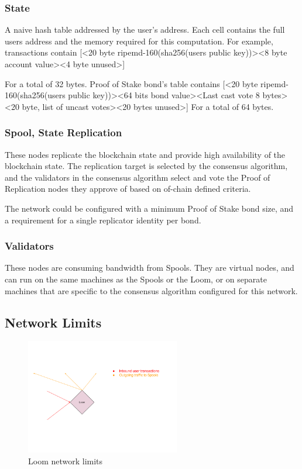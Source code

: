 \documentclass[12pt]{article}
\begin{document}
\subsubsection{State}

A naive hash table addressed by the user’s address.  Each cell contains the full users address and the memory required for this computation.  For example, transactions contain
[<20 byte ripemd-160(sha256(users public key))><8 byte account value><4 byte unused>]

For a total of 32 bytes.   Proof of Stake bond’s table contains
[<20 byte ripemd-160(sha256(users public key))><64 bits bond value><Last cast vote 8 bytes><20 byte, list of uncast votes><20 bytes unused>]
For a total of 64 bytes.

\subsubsection{Spool, State Replication}
These nodes replicate the blockchain state and provide high availability of the blockchain state. The replication target is selected by the consensus algorithm, and the validators in the consensus algorithm select and vote the Proof of Replication nodes they approve of based on of-chain defined criteria.

The network could be configured with a minimum Proof of Stake bond size, and a requirement for a single replicator identity per bond.
\subsubsection{Validators}
These nodes are consuming bandwidth from Spools.  They are virtual nodes, and can run on the same machines as the Spools or the Loom, or on separate machines that are specific to the consensus algorithm configured for this network.

\subsection{Network Limits}

\begin{figure}
  \begin{center}
    \centering
    \includegraphics[width=0.6\textwidth]{figures/fig_10.png}
    \caption[Fig 10]{Loom network limits\label{fig_10}}
  \end{center}
  \end{figure}
\end{document}
